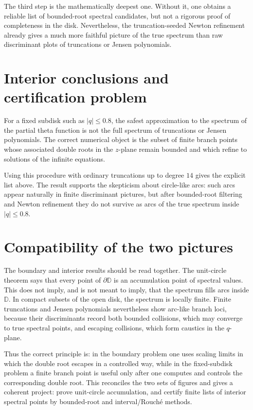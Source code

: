 \documentclass[11pt,a4paper,reqno]{amsart}
\theoremstyle{remark}
\newcommand{\D}{\mathbb D}
\begin{document}
The third step is the mathematically deepest one.  Without it, one obtains a reliable list of bounded-root spectral candidates, but not a rigorous proof of completeness in the disk.  Nevertheless, the truncation-seeded Newton refinement already gives a much more faithful picture of the true spectrum than raw discriminant plots of truncations or Jensen polynomials.

\section{Interior conclusions and certification problem}
For a fixed subdisk such as $|q|\leq0.8$, the safest approximation to the spectrum of the partial theta function is not the full spectrum of truncations or Jensen polynomials.  The correct numerical object is the subset of finite branch points whose associated double roots in the $z$-plane remain bounded and which refine to solutions of the infinite equations.

Using this procedure with ordinary truncations up to degree $14$ gives the explicit list above.  The result supports the skepticism about circle-like arcs: such arcs appear naturally in finite discriminant pictures, but after bounded-root filtering and Newton refinement they do not survive as arcs of the true spectrum inside $|q|\leq0.8$.


\section{Compatibility of the two pictures}
The boundary and interior results should be read together.  The unit-circle theorem says that every point of \(\partial\D\) is an accumulation point of spectral values.  This does not imply, and is not meant to imply, that the spectrum fills arcs inside \(\D\).  In compact subsets of the open disk, the spectrum is locally finite.  Finite truncations and Jensen polynomials nevertheless show arc-like branch loci, because their discriminants record both bounded collisions, which may converge to true spectral points, and escaping collisions, which form caustics in the \(q\)-plane.

Thus the correct principle is: in the boundary problem one uses scaling limits in which the double root escapes in a controlled way, while in the fixed-subdisk problem a finite branch point is useful only after one computes and controls the corresponding double root.  This reconciles the two sets of figures and gives a coherent project: prove unit-circle accumulation, and certify finite lists of interior spectral points by bounded-root and interval/Rouch\'e methods.
\end{document}
